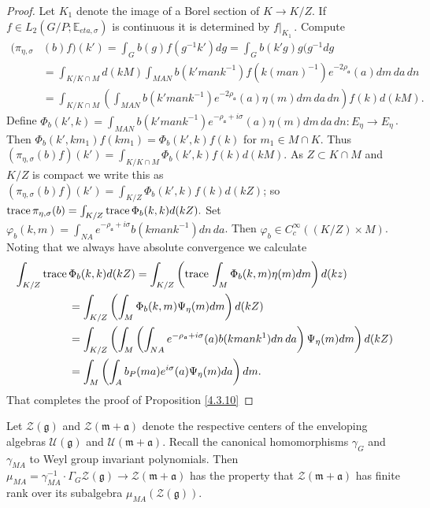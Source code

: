 \documentclass{conm-p-l}
\renewcommand{\gg}{\mathfrak{g}}
\def\ga{\mathfrak{a}}
\def\gg{\mathfrak{g}}
\def\gm{\mathfrak{m}}
\def\E{\mathbb{E}}
\def\cU{\mathcal{U}}
\def\cZ{\mathcal{Z}}
\begin{document}
\begin{proof} Let $K_1$ denote the image of a Borel section of $K \to K/Z$.
If $f \in L_2(G/P;\E_{eta,\sigma})$ is continuous it is determined by 
$f|_{K_1}$\,.  Compute
$$
\begin{aligned}
(\pi_{\eta,\sigma}&(b)f)(k') = \int_G b(g)f(g^{-1}k')dg = 
			\int_G b(k'g)g(g^{-1}dg \\
&= \int_{K/K\cap M} d(kM)\int_{MAN}  b(k'mank^{-1})f(k(man)^{-1})
			e^{-2\rho_\ga}(a) dm\, da\, dn \\
&= \int_{K/K\cap M}\left ( \int_{MAN} b(k'mank^{-1}) e^{-2\rho_\ga}(a)
			\eta(m) dm\, da\, dn \right ) f(k)d(kM).
\end{aligned}
$$
Define $\Phi_b(k',k) = \int_{MAN} b(k'mank^{-1}) e^{-\rho_\ga +i\sigma}(a)
\eta(m) dm\, da\, dn : E_\eta \to E_\eta$\,.  Then $\Phi_b(k',km_1)f(km_1)
= \Phi_b(k',k)f(k)$ for $m_1 \in M\cap K$.  Thus
$
(\pi_{\eta,\sigma}(b)f)(k') = \int_{K/K\cap M} \Phi_b(k',k) f(k) d(kM).
$
As $Z \subset K\cap M$ and $K/Z$ is compact we write this as
$(\pi_{\eta,\sigma}(b)f)(k') = \int_{K/Z} \Phi_b(k',k) f(k) d(kZ)$; so
$
\text{trace\,} \pi_{\eta,\sigma}(b) 
	= \int_{K/Z} \text{trace\,} \Phi_b(k,k) d(kZ).
$
Set $\varphi_b(k,m) = \int_{NA}e^{-\rho_\ga +i\sigma}b(kmank^{-1}) dn\, da$.
Then $\varphi_b \in C^\infty_c((K/Z)\times M)$.  Noting that we always have
absolute convergence we calculate
$$
\begin{aligned}
\int_{K/Z}\text{trace\,}& \Phi_b(k,k) d(kZ)
	= \int_{K/Z}\left ( \text{trace\,} \int_M \Phi_b(k,m)\eta(m)dm
		\right ) d(kz) \\
&= \int_{K/Z}\left ( \int_M \Phi_b(k,m)\Psi_\eta(m)dm\right ) d(kZ)\\
&= \int_{K/Z}\left ( \int_M \left ( \int_{NA} e^{-\rho_\ga +i\sigma}(a)
	b(kmank^{1})dn\,da\right )\Psi_\eta(m)dm\right ) d(kZ)\\
&= \int_M\left ( \int_A b_P(ma)e^{i\sigma}(a)\Psi_\eta(m)da\right ) dm.
\end{aligned}
$$
That completes the proof of Proposition \ref{4.3.10}
\end{proof}

Let $\cZ(\gg)$ and $\cZ(\gm+\ga)$ denote the respective centers of the 
enveloping algebras $\cU(\gg)$ and $\cU(\gm+\ga)$.  Recall the canonical
homomorphisms $\gamma_G$ and $\gamma_{MA}$ to Weyl group invariant polynomials.
Then \cite[\S 12]{HC1965a} $\mu_{MA} = \gamma_{MA}^{-1}\cdot\Gamma_G
\cZ(\gg) \to \cZ(\gm+\ga)$ has the property that $\cZ(\gm+\ga)$ has finite
rank over its subalgebra $\mu_{MA}(\cZ(\gg))$.
\end{document}
